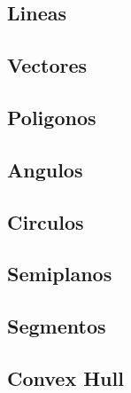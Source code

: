 \subsection{Lineas}
\raggedbottom
\hrulefill
\subsection{Vectores}
\raggedbottom
\hrulefill
\subsection{Poligonos}
\raggedbottom
\hrulefill
\subsection{Angulos}
\raggedbottom
\hrulefill
\subsection{Circulos}
\raggedbottom
\hrulefill
\subsection{Semiplanos}
\raggedbottom
\hrulefill
\subsection{Segmentos}
\raggedbottom
\hrulefill
\subsection{Convex Hull}
\raggedbottom
\hrulefill

